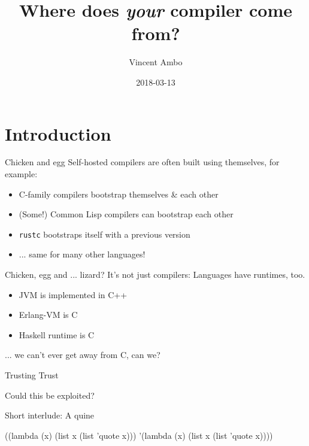 \documentclass[12pt]{beamer}
\title{Where does \textit{your} compiler come from?}
\date{2018-03-13}
\author{Vincent Ambo}
\institute{Norwegian Unix User Group}
\newenvironment{code}{\ttfamily}{\par}
\begin{document}
  \maketitle

  \section{Introduction}

  \begin{frame}{Chicken and egg}
    Self-hosted compilers are often built using themselves, for example:

    \begin{itemize}
    \item C-family compilers bootstrap themselves \& each other
    \item (Some!) Common Lisp compilers can bootstrap each other
    \item \texttt{rustc} bootstraps itself with a previous version
    \item ... same for many other languages!
    \end{itemize}
  \end{frame}

  \begin{frame}{Chicken, egg and ... lizard?}
    It's not just compilers: Languages have runtimes, too.

    \begin{itemize}
    \item JVM is implemented in C++
    \item Erlang-VM is C
    \item Haskell runtime is C
    \end{itemize}

    ... we can't ever get away from C, can we?
  \end{frame}

  \begin{frame}{Trusting Trust}
    \begin{center}
      \huge{Could this be exploited?}
    \end{center}
  \end{frame}

  \begin{frame}{Short interlude: A quine}
    \begin{center}
      \begin{code}
        ((lambda (x) (list x (list 'quote x)))
        \newline\vspace*{6mm} '(lambda (x) (list x (list 'quote x))))
      \end{code}
    \end{center}
  \end{frame}
\end{document}
